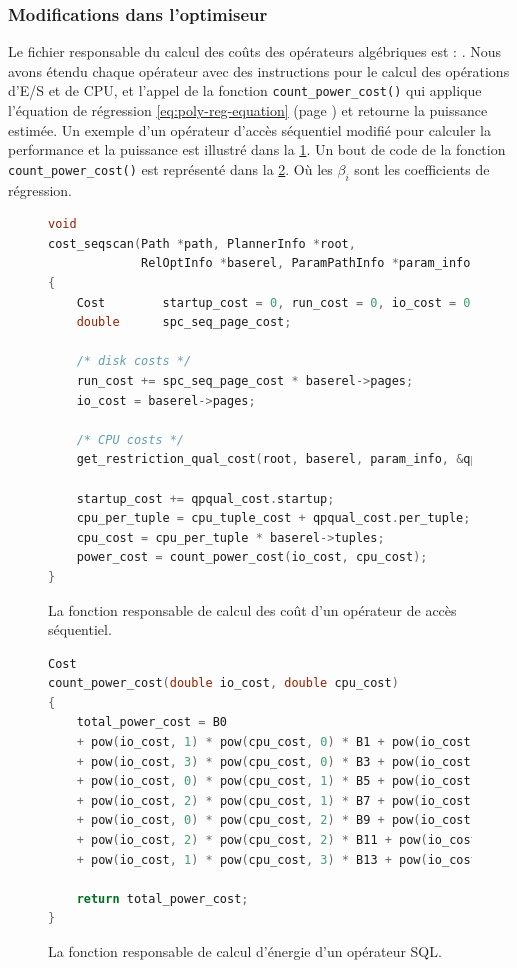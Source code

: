 \subsubsection{Modifications dans l'optimiseur}
Le fichier responsable du calcul des coûts des opérateurs algébriques est : . Nous avons étendu chaque opérateur avec des instructions pour le calcul des opérations d'E/S et de CPU, et l'appel de la fonction \texttt{count\_power\_cost()} qui applique l'équation de régression \ref{eq:poly-reg-equation} (page \pageref{eq:poly-reg-equation}) et retourne la puissance estimée. Un exemple d'un opérateur d'accès séquentiel modifié pour calculer la performance et la puissance est illustré dans la \ref{fig:enerquery-costsize-seqscan}. Un bout de code de la fonction \texttt{count\_power\_cost()} est représenté dans la \ref{fig:enerquery-costsize}. Où les $\beta_i$ sont les coefficients de régression.

\begin{figure}
\begin{lstlisting}[language=C]
void
cost_seqscan(Path *path, PlannerInfo *root,
			 RelOptInfo *baserel, ParamPathInfo *param_info)
{
	Cost		startup_cost = 0, run_cost = 0, io_cost = 0, cpu_cost = 0, power_cost = 0;
	double		spc_seq_page_cost;

	/* disk costs */
	run_cost += spc_seq_page_cost * baserel->pages;
	io_cost = baserel->pages;

	/* CPU costs */
	get_restriction_qual_cost(root, baserel, param_info, &qpqual_cost);

	startup_cost += qpqual_cost.startup;
	cpu_per_tuple = cpu_tuple_cost + qpqual_cost.per_tuple;
	cpu_cost = cpu_per_tuple * baserel->tuples;
	power_cost = count_power_cost(io_cost, cpu_cost);
}
\end{lstlisting}
  \caption{La fonction responsable de calcul des coût d'un opérateur de accès séquentiel.}\label{fig:enerquery-costsize-seqscan}
\end{figure}

\begin{figure}
\begin{lstlisting}[language=C]
Cost 
count_power_cost(double io_cost, double cpu_cost)
{
	total_power_cost = B0
	+ pow(io_cost, 1) * pow(cpu_cost, 0) * B1 + pow(io_cost, 2) * pow(cpu_cost, 0) * B2
	+ pow(io_cost, 3) * pow(cpu_cost, 0) * B3 + pow(io_cost, 4) * pow(cpu_cost, 0) * B4
	+ pow(io_cost, 0) * pow(cpu_cost, 1) * B5 + pow(io_cost, 1) * pow(cpu_cost, 1) * B6
	+ pow(io_cost, 2) * pow(cpu_cost, 1) * B7 + pow(io_cost, 3) * pow(cpu_cost, 1) * B8
	+ pow(io_cost, 0) * pow(cpu_cost, 2) * B9 + pow(io_cost, 1) * pow(cpu_cost, 2) * B10
	+ pow(io_cost, 2) * pow(cpu_cost, 2) * B11 + pow(io_cost, 0) * pow(cpu_cost, 3) * B12
	+ pow(io_cost, 1) * pow(cpu_cost, 3) * B13 + pow(io_cost, 0) * pow(cpu_cost, 4) * B14;
	
	return total_power_cost;
}
\end{lstlisting}
  \caption{La fonction responsable de calcul d'énergie d'un opérateur SQL.}\label{fig:enerquery-costsize}
\end{figure}

